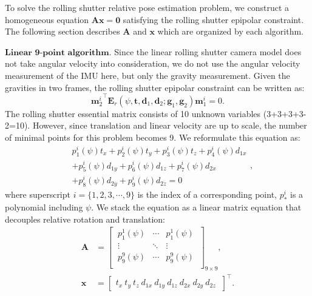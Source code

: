 \documentclass[10pt,twocolumn,letterpaper]{article}
\theoremstyle{definition}
\begin{document}
	
	To solve the rolling shutter relative pose estimation problem, we construct a homogeneous equation $\mathbf{A}\mathbf{x}=\mathbf{0}$ satisfying the rolling shutter epipolar constraint.
	The following section describes $\mathbf{A}$ and $\mathbf{x}$ which are organized by each algorithm.
	
	\vspace{3mm}
	\noindent $\textbf{Linear 9-point algorithm.}$
	Since the linear rolling shutter camera model does not take angular velocity into consideration, we do not use the angular velocity measurement of the IMU here, but only the gravity measurement.
	Given the gravities in two frames, the rolling shutter epipolar constraint can be written as:
	\begin{equation}
	{\mathbf{m}_{2}^{i}}^{\top} \mathbf{E}_{r} (\psi,\mathbf{t},\mathbf{d}_1,\mathbf{d}_2 ; \mathbf{g}_1,\mathbf{g}_2) \mathbf{m}_{1}^{i} = 0 .
	\label{eq:rolling_shutter_epipolar_geometry}
	\end{equation}
	The rolling shutter essential matrix consists of 10 unknown variables (3+3+3+3-2=10).
	However, since translation and linear velocity are up to scale, the number of minimal points for this problem becomes 9.
	We reformulate this equation as:
	\begin{equation}
	\begin{split}
	& p_{1}^i(\psi) t_x + p_{2}^i(\psi) t_y + p_{3}^i(\psi) t_z + p_{4}^i(\psi) d_{1x} \\ 
	& + p_{5}^i(\psi) d_{1y} + p_{6}^i(\psi) d_{1z} + p_{7}^i(\psi) d_{2x} \\
	& + p_{8}^i(\psi) d_{2y} + p_{9}^i(\psi) d_{2z} =   0 
	\end{split} ,	
	\end{equation}
	where superscript $i = \{1,2,3,\cdots,9\}$ is the index of a corresponding point,
	$p_{*}^i$ is a polynomial including $\psi$.
	We stack the equation as a linear matrix equation that decouples relative rotation and translation:
	\begin{equation}
	\begin{split}
	\mathbf{A} &= 
	\begin{bmatrix}
	\ p_{1}^1(\psi) & \cdots & p_{1}^1(\psi) \ \\
	\ \vdots & \ddots & \vdots \ \\
	\ p_{9}^9(\psi) & \cdots & p_{9}^9(\psi) \ \\
	\end{bmatrix}_{9 \times 9} , \\
	\mathbf{x} &= 
	\begin{bmatrix}
	t_x \ 
	t_y \
	t_z \
	d_{1x} \
	d_{1y} \
	d_{1z} \
	d_{2x} \
	d_{2y} \
	d_{2z} \
	\end{bmatrix}^{\top} .
	\end{split}
	\end{equation}
	
\end{document}
